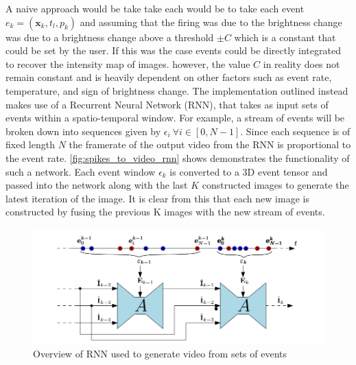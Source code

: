 A naive approach would be take take each would be to take each event $ e_k = (\boldsymbol{\mathbf{x}}_k, t_l, p_k ) $ and assuming that the firing was due to the brightness change was due to a brightness change above a threshold $ \pm C $ which is a constant that could be set by the user. If this was the case events could be directly integrated to recover the intensity map of images. however, the value $ C $ in reality does not remain constant and is heavily dependent on other factors such as event rate, temperature, and sign of brightness change. The implementation outlined instead makes use of a Recurrent Neural Network (RNN), that takes as input sets of events within a spatio-temporal window. For example, a stream of events will be broken down into sequences given by $ \epsilon_i \: \forall i \in [0, N-1] $. Since each sequence is of fixed length $ N $ the framerate of the output video from the RNN is proportional to the event rate. \autoref{fig:spikes_to_video_rnn} shows demonstrates the functionality of such a network. Each event window $ \epsilon_k $ is converted to a 3D event tensor and passed into the network along with the last $ K $ constructed images to generate the latest iteration of the image. It is clear from this that each new image is constructed by fusing the previous K images with the new stream of events.

\begin{figure}[htb]
      \centering
      \includegraphics[width=\textwidth]{background/images/spikes_to_video_rnn.png}
      \caption{Overview of RNN used to generate video from sets of events\cite{spikingToVideo}}
      \label{fig:spikes_to_video_rnn}
\end{figure}